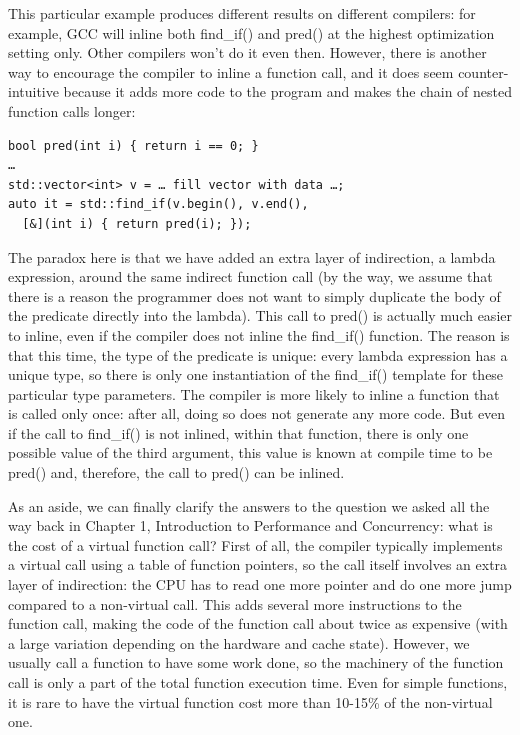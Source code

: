 This particular example produces different results on different compilers: for example, GCC will inline both find\_if() and pred() at the highest optimization setting only. Other compilers won't do it even then. However, there is another way to encourage the compiler to inline a function call, and it does seem counter-intuitive because it adds more code to the program and makes the chain of nested function calls longer:

\begin{lstlisting}[style=styleCXX]
bool pred(int i) { return i == 0; }
… 
std::vector<int> v = … fill vector with data …;
auto it = std::find_if(v.begin(), v.end(), 
  [&](int i) { return pred(i); });
\end{lstlisting}

The paradox here is that we have added an extra layer of indirection, a lambda expression, around the same indirect function call (by the way, we assume that there is a reason the programmer does not want to simply duplicate the body of the predicate directly into the lambda). This call to pred() is actually much easier to inline, even if the compiler does not inline the find\_if() function. The reason is that this time, the type of the predicate is unique: every lambda expression has a unique type, so there is only one instantiation of the find\_if() template for these particular type parameters. The compiler is more likely to inline a function that is called only once: after all, doing so does not generate any more code. But even if the call to find\_if() is not inlined, within that function, there is only one possible value of the third argument, this value is known at compile time to be pred() and, therefore, the call to pred() can be inlined.

As an aside, we can finally clarify the answers to the question we asked all the way back in Chapter 1, Introduction to Performance and Concurrency: what is the cost of a virtual function call? First of all, the compiler typically implements a virtual call using a table of function pointers, so the call itself involves an extra layer of indirection: the CPU has to read one more pointer and do one more jump compared to a non-virtual call. This adds several more instructions to the function call, making the code of the function call about twice as expensive (with a large variation depending on the hardware and cache state). However, we usually call a function to have some work done, so the machinery of the function call is only a part of the total function execution time. Even for simple functions, it is rare to have the virtual function cost more than 10-15\% of the non-virtual one.


